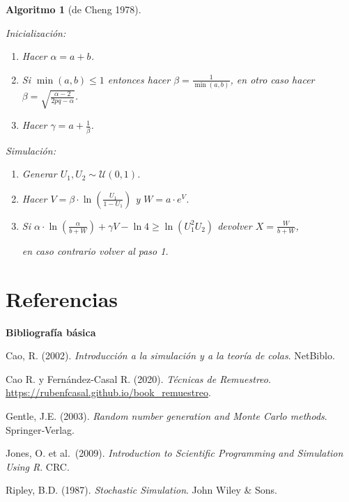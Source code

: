 \documentclass[
]{book}
\theoremstyle{break}
\newtheorem{conjecture}{Algoritmo}[chapter]
\theoremstyle{nonumberplain}
\begin{document}
\begin{conjecture}[de Cheng 1978]
\protect\hypertarget{cnj:cheng}{}\label{cnj:cheng}

Inicialización:

\begin{enumerate}
\def\labelenumi{\arabic{enumi}.}
\item
  Hacer \(\alpha = a + b\).
\item
  Si \(\min(a,b) \leq1\) entonces hacer \(\beta=\frac1{\min( a,b)}\), en otro caso hacer \(\beta=\sqrt{\frac{\alpha-2}{2pq-\alpha}}\).
\item
  Hacer \(\gamma=a+\frac1\beta\).
\end{enumerate}

Simulación:

\begin{enumerate}
\def\labelenumi{\arabic{enumi}.}
\item
  Generar \(U_1, U_2\sim \mathcal{U}(0, 1)\).
\item
  Hacer \(V=\beta\cdot\ln\left( \frac{U_1}{1-U_1}\right)\) y \(W=a\cdot e^{V}\).
\item
  Si \(\alpha\cdot\ln\left( \frac\alpha{b+W}\right) +\gamma V-\ln4 \ge \ln\left( U_1^{2}U_2\right)\) devolver \(X=\frac W{b+W}\),

  en caso contrario volver al paso 1.
\end{enumerate}

\end{conjecture}

\hypertarget{referencias}{%
\chapter*{Referencias}\label{referencias}}

\textbf{Bibliografía básica}

Cao, R. (2002). \emph{Introducción a la simulación y a la teoría de colas}. NetBiblo.

Cao R. y Fernández-Casal R. (2020). \emph{Técnicas de Remuestreo}. \url{https://rubenfcasal.github.io/book_remuestreo}.

Gentle, J.E. (2003). \emph{Random number generation and Monte Carlo methods}. Springer‐Verlag.

Jones, O. et al.~(2009). \emph{Introduction to Scientific Programming and Simulation Using R}. CRC.

Ripley, B.D. (1987). \emph{Stochastic Simulation}. John Wiley \& Sons.
\end{document}
